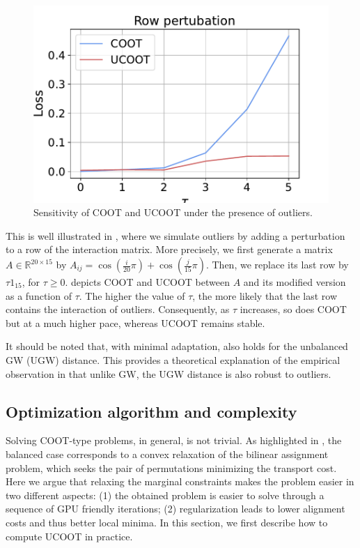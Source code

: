 \setlength{\columnsep}{10pt}%
\setlength{\intextsep}{0pt}
\begin{figure}
  \centering
  \vspace{-10pt}
  \includegraphics[width=\linewidth]{./Chapitre3/fig/robustness_2.pdf}
  \caption{Sensitivity of COOT and UCOOT under the presence of outliers.
  \label{fig:robust}}
\end{figure}
This is well illustrated in ,
where we simulate outliers by adding a perturbation to a row of the interaction matrix.
More precisely, we first generate a matrix $A \in \mathbb R^{20 \times 15}$ by
$A_{ij} = \cos(\frac{i}{20} \pi) + \cos(\frac{j}{15} \pi)$.
Then, we replace its last row by $\tau 1_{15}$, for $\tau \geq 0$.
 depicts COOT and UCOOT between $A$
and its modified version as a function of $\tau$. The higher the value of $\tau$,
the more likely that the last row contains the interaction of outliers.
Consequently, as $\tau$ increases, so does COOT but at a much higher pace,
whereas UCOOT remains stable.

It should be noted that, with minimal adaptation, 
also holds for the unbalanced GW (UGW) distance.
This provides a theoretical explanation of the empirical observation in \citep{Sejourne20}
that unlike GW, the UGW distance is also robust to outliers.

\subsection{Optimization algorithm and complexity} \label{subsec_app:algo}
Solving COOT-type problems, in general, is not trivial. As highlighted in \citep{Redko20},
the balanced case corresponds to a convex relaxation of the bilinear assignment problem,
which seeks the pair of permutations minimizing the transport cost.
Here we argue that relaxing the marginal constraints makes the problem easier
in two different aspects: (1) the obtained problem is easier to solve
through a sequence of GPU friendly iterations; (2) regularization leads to lower alignment costs
and thus better local minima. In this section, we first describe how to compute UCOOT in practice.

